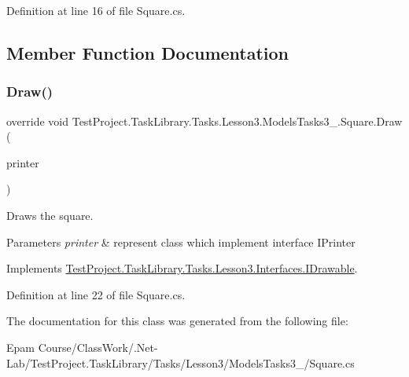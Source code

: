 Definition at line 16 of file Square.\+cs.



\subsection{Member Function Documentation}
\mbox{\label{class_test_project_1_1_task_library_1_1_tasks_1_1_lesson3_1_1_models_tasks3__4_1_1_square_a564aa1273ffb7fa43c6e5774c4702716}} 
\subsubsection{\texorpdfstring{Draw()}{Draw()}}
{\footnotesize\ttfamily override void Test\+Project.\+Task\+Library.\+Tasks.\+Lesson3.\+Models\+Tasks3\+\_.\+Square.\+Draw (\begin{DoxyParamCaption}\item[{I\+Printer}]{printer }\end{DoxyParamCaption})}



Draws the square. 


\begin{DoxyParams}{Parameters}
{\em printer} & represent class which implement interface I\+Printer\\
\hline
\end{DoxyParams}


Implements \mbox{\hyperlink{interface_test_project_1_1_task_library_1_1_tasks_1_1_lesson3_1_1_interfaces_1_1_i_drawable_a42d4b370fc36d2f695e312d7780c05d6}{Test\+Project.\+Task\+Library.\+Tasks.\+Lesson3.\+Interfaces.\+I\+Drawable}}.



Definition at line 22 of file Square.\+cs.



The documentation for this class was generated from the following file\+:\begin{DoxyCompactItemize}
\item 
Epam Course/\+Class\+Work/.\+Net-\/\+Lab/\+Test\+Project.\+Task\+Library/\+Tasks/\+Lesson3/\+Models\+Tasks3\+\_/Square.\+cs\end{DoxyCompactItemize}
